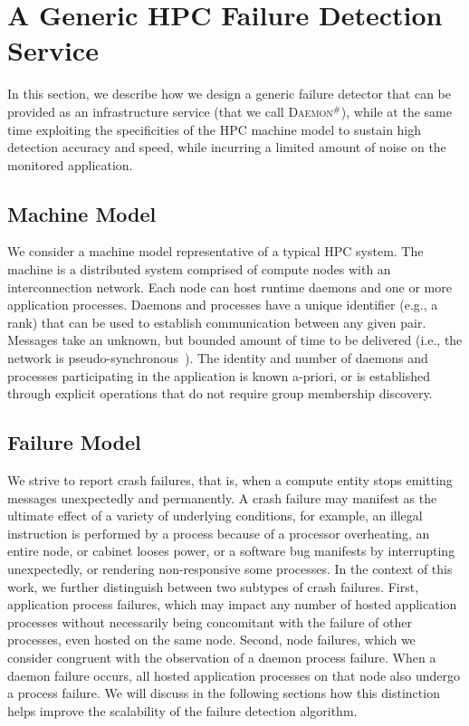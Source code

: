 \documentclass[sigconf]{acmart}
\newcommand{\ourwork}[0]{\textsc{Daemon}\ensuremath{^\#}\xspace}
\begin{document}
\section{A Generic HPC Failure Detection Service}\label{sec:design}

In this section, we describe how we design a generic failure detector that can
be provided 
as an infrastructure service (that we call \ourwork), while at the same time exploiting the 
specificities of the HPC machine model to sustain high detection accuracy 
and speed, while incurring a limited amount of noise on the monitored application. 

\subsection{Machine Model}

We consider a machine model representative of a typical HPC system. 
The machine is a distributed system comprised of compute nodes with an 
interconnection network. Each 
node can host runtime daemons and one or more application processes. Daemons 
and processes have a unique identifier (e.g., a rank) that can be used
to establish communication between any given pair. Messages take an unknown,
but bounded amount of time to be delivered (i.e., the network is pseudo-synchronous~\cite{Chandra96}).
 The identity and number of daemons and processes participating in the application is known a-priori, 
or is established through explicit operations that do not require group 
membership discovery. 

\subsection{Failure Model}

We strive to report crash failures, that is, when a compute entity stops emitting 
messages unexpectedly and permanently. A crash failure may manifest as
the ultimate effect of a variety of underlying conditions, for example, an illegal instruction 
is performed by a process because of a processor overheating, an entire 
node, or cabinet looses power, or a software bug manifests by interrupting 
unexpectedly, or rendering non-responsive some processes. In the context of 
this work, we further distinguish between two subtypes of crash failures.
First, application process failures, which may impact any number of 
hosted application processes without necessarily being concomitant
with the failure of other processes, even hosted on the same node.
Second, node failures, which we consider congruent with the observation of a daemon 
process failure. When a daemon failure occurs, all hosted application processes on
that node also undergo a process failure. We will discuss in the following 
sections how this distinction helps improve the scalability of the failure 
detection algorithm. 
\end{document}
